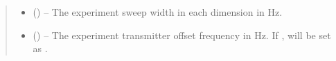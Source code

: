 \documentclass[letterpaper,10pt,english]{sphinxmanual}
\begin{document}
\begin{fulllineitems}
\begin{quote}
\begin{description}
\begin{itemize}
\begin{itemize}
\item {} 
\sphinxAtStartPar
{}

\begin{sphinxVerbatim}[commandchars=\\\{\}]
  \PYG{p}{[}
    \PYG{p}{[}     \PYG{p}{]}
    \PYG{p}{[}     \PYG{p}{]}
    \PYG{p}{[}     \PYG{p}{]}
\PYG{p}{]}
\end{sphinxVerbatim}

\end{itemize}


\item {} 
\sphinxAtStartPar
{} (\sphinxstyleliteralemphasis{\sphinxupquote{{[}}}\sphinxstyleliteralemphasis{\sphinxupquote{{]} or }}\sphinxstyleliteralemphasis{\sphinxupquote{{[}}}\sphinxstyleliteralemphasis{\sphinxupquote{, }}\sphinxstyleliteralemphasis{\sphinxupquote{{]}}}) – The experiment sweep width in each dimension in Hz.

\item {} 
\sphinxAtStartPar
{} (\sphinxstyleliteralemphasis{\sphinxupquote{{[}}}\sphinxstyleliteralemphasis{\sphinxupquote{{]} or }}\sphinxstyleliteralemphasis{\sphinxupquote{{[}}}\sphinxstyleliteralemphasis{\sphinxupquote{, }}\sphinxstyleliteralemphasis{\sphinxupquote{{]} or }}\sphinxstyleliteralemphasis{\sphinxupquote{, }}) – The experiment transmitter offset frequency in Hz. If ,
 will be set as .


\end{itemize}
\end{description}
\end{quote}
\end{fulllineitems}
\end{document}
